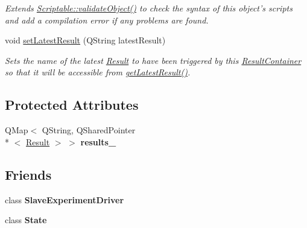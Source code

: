 \begin{DoxyCompactItemize}
\begin{DoxyCompactList}\small\item\em Extends \hyperlink{class_picto_1_1_scriptable_ab6e2944c43a3b5d418bf7b251594386d}{Scriptable\-::validate\-Object()} to check the syntax of this object's scripts and add a compilation error if any problems are found. \end{DoxyCompactList}\item 
void \hyperlink{class_picto_1_1_result_container_a2a7351bf950410d0dd94e7cbdae73fff}{set\-Latest\-Result} (Q\-String latest\-Result)
\begin{DoxyCompactList}\small\item\em Sets the name of the latest \hyperlink{class_picto_1_1_result}{Result} to have been triggered by this \hyperlink{class_picto_1_1_result_container}{Result\-Container} so that it will be accessible from \hyperlink{class_picto_1_1_result_container_ada1e696915489f882b994774b4a2bf63}{get\-Latest\-Result()}. \end{DoxyCompactList}\end{DoxyCompactItemize}
\subsection*{Protected Attributes}
\begin{DoxyCompactItemize}
\item 
\hypertarget{class_picto_1_1_result_container_a6f3071ebf4e55b68f37ddb907c4da2f4}{Q\-Map$<$ Q\-String, Q\-Shared\-Pointer\\*
$<$ \hyperlink{class_picto_1_1_result}{Result} $>$ $>$ {\bfseries results\-\_\-}}\label{class_picto_1_1_result_container_a6f3071ebf4e55b68f37ddb907c4da2f4}

\end{DoxyCompactItemize}
\subsection*{Friends}
\begin{DoxyCompactItemize}
\item 
\hypertarget{class_picto_1_1_result_container_a90c7971ba26fd5050e30ed8ff64e0e29}{class {\bfseries Slave\-Experiment\-Driver}}\label{class_picto_1_1_result_container_a90c7971ba26fd5050e30ed8ff64e0e29}

\item 
\hypertarget{class_picto_1_1_result_container_a7edbf9e31116a21e4e18cd2dd004ae63}{class {\bfseries State}}\label{class_picto_1_1_result_container_a7edbf9e31116a21e4e18cd2dd004ae63}

\end{DoxyCompactItemize}
